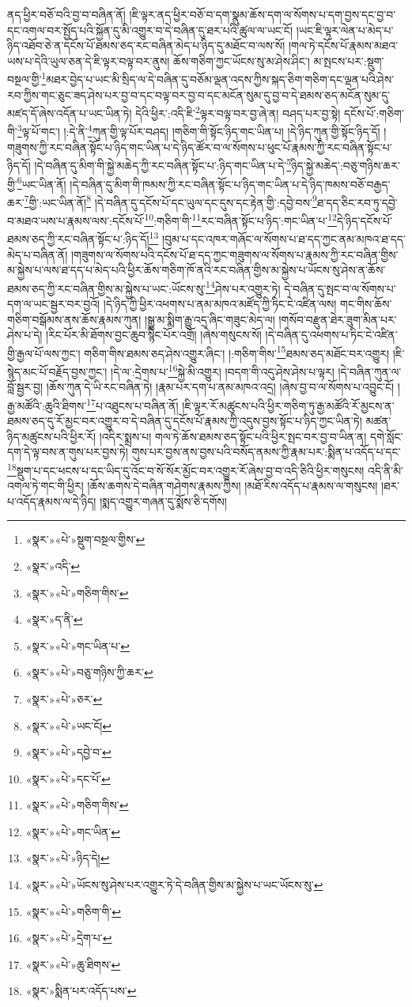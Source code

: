 ནད་ཕྱིར་བཅོ་བའི་བྱ་བ་བཞིན་ནོ། །ཇི་ལྟར་ནད་ཕྱིར་བཅོ་བ་དག་སྣུམ་ཆོས་དག་ལ་སོགས་པ་དག་བྱས་དང་བྱ་བ་དང་འགལ་བར་སྤྱོད་པའི་སྐྱོན་དུ་མི་འགྱུར་བ་དེ་བཞིན་དུ་ཐར་པའི་ཚུལ་ལ་ཡང་ངོ། །ཡང་ཇི་ལྟར་ལེན་པ་མེད་པ་ཉིད་འཐོབ་ཅེ་ན་དངོས་པོ་ཐམས་ཅད་རང་བཞིན་མེད་པ་ཉིད་དུ་མཐོང་བ་ལས་སོ། །གལ་ཏེ་དངོས་པོ་རྣམས་མཐའ་ཡས་པ་དེའི་ཡུལ་ཅན་དེ་ཇི་ལྟར་བལྟ་བར་ནུས། ཆོས་གཅིག་ཀྱང་ཡོངས་སུ་མ་ཤེས་ཤིང་། མ་སྤངས་པར་:སྡུག་བསྔལ་གྱི་\footnote{«སྣར་»«པེ་»སྡུག་བསྔལ་གྱིས་}མཐར་བྱེད་པ་ཡང་མི་སྲིད་ལ་དེ་བཞིན་དུ་བཅོམ་ལྡན་འདས་ཀྱིས་སྐད་ཅིག་གཅིག་དང་ལྡན་པའི་ཤེས་རབ་ཀྱིས་གང་ཅུང་ཟད་ཤེས་པར་བྱ་བ་དང་བལྟ་བར་བྱ་བ་དང་མངོན་སུམ་དུ་བྱ་བ་དེ་ཐམས་ཅད་མངོན་སུམ་དུ་མཛད་དོ་ཞེས་འདོན་པ་ཡང་ཡིན་ཏེ། དེའི་ཕྱིར་:འདི་ཇི་\footnote{«སྣར་»འདི་}ལྟར་བལྟ་བར་བྱ་ཞེ་ན། བཤད་པར་བྱ་སྟེ། དངོས་པོ་:གཅིག་གི་\footnote{«སྣར་»«པེ་»གཅིག་གིས་}ལྟ་པོ་གང་། །:དེ་ནི་\footnote{«སྣར་»ད་ནི་}ཀུན་གྱི་ལྟ་པོར་བཤད། །གཅིག་གི་སྟོང་ཉིད་གང་ཡིན་པ། །དེ་ཉིད་ཀུན་གྱི་སྟོང་ཉིད་དོ། །གཟུགས་ཀྱི་རང་བཞིན་སྟོང་པ་ཉིད་གང་ཡིན་པ་དེ་ཉིད་ཚོར་བ་ལ་སོགས་པ་ཕུང་པོ་རྣམས་ཀྱི་རང་བཞིན་སྟོང་པ་ཉིད་དོ། །དེ་བཞིན་དུ་མིག་གི་སྐྱེ་མཆེད་ཀྱི་རང་བཞིན་སྟོང་པ་:ཉིད་གང་ཡིན་པ་དེ་\footnote{«སྣར་»«པེ་»གང་ཡིན་པ་}ཉིད་སྐྱེ་མཆེད་:བཅུ་གཉིས་ཆར་གྱི་\footnote{«སྣར་»«པེ་»བཅུ་གཉིས་ཀྱི་ཆར་}ཡང་ཡིན་ནོ། །དེ་བཞིན་དུ་མིག་གི་ཁམས་ཀྱི་རང་བཞིན་སྟོང་པ་ཉིད་གང་ཡིན་པ་དེ་ཉིད་ཁམས་བཅོ་བརྒྱད་ཆར་\footnote{«སྣར་»«པེ་»ཅར་}གྱི་:ཡང་ཡིན་ནོ།\footnote{«སྣར་»«པེ་»ཡང་ངོ།} །དེ་བཞིན་དུ་དངོས་པོ་དང་ཡུལ་དང་དུས་དང་རྟེན་གྱི་:དབྱེ་བས་\footnote{«སྣར་»«པེ་»དབྱེ་བ་}ཐ་དད་ཅིང་རབ་ཏུ་དབྱེ་བ་མཐའ་ཡས་པ་རྣམས་ལས་:དངོས་པོ་\footnote{«སྣར་»«པེ་»དང་པོ་}:གཅིག་གི་\footnote{«སྣར་»«པེ་»གཅིག་གིས་}རང་བཞིན་སྟོང་པ་ཉིད་:གང་ཡིན་པ་\footnote{«སྣར་»«པེ་»གང་ཡིན་}དེ་ཉིད་དངོས་པོ་ཐམས་ཅད་ཀྱི་རང་བཞིན་སྟོང་པ་:ཉིད་དོ།\footnote{«སྣར་»«པེ་»ཉིད་དེ།} །བུམ་པ་དང་འཁར་གཞོང་ལ་སོགས་པ་ཐ་དད་ཀྱང་ནམ་མཁའ་ཐ་དད་མེད་པ་བཞིན་ནོ། །གཟུགས་ལ་སོགས་པའི་དངོས་པོ་ཐ་དད་ཀྱང་གཟུགས་ལ་སོགས་པ་རྣམས་ཀྱི་རང་བཞིན་གྱིས་མ་སྐྱེས་པ་ལས་ཐ་དད་པ་མེད་པའི་ཕྱིར་ཆོས་གཅིག་ཁོ་ནའི་རང་བཞིན་གྱིས་མ་སྐྱེས་པ་ཡོངས་སུ་ཤེས་ན་ཆོས་ཐམས་ཅད་ཀྱི་རང་བཞིན་གྱིས་མ་སྐྱེས་པ་ཡང་:ཡོངས་སུ་\footnote{«སྣར་»«པེ་»ཡོངས་སུ་ཤེས་པར་འགྱུར་ཏེ་དེ་བཞིན་གྱིས་མ་སྐྱེས་པ་ཡང་ཡོངས་སུ་}ཤེས་པར་འགྱུར་ཏེ། དེ་བཞིན་དུ་སྤང་བ་ལ་སོགས་པ་དག་ལ་ཡང་སྦྱར་བར་བྱའོ། །དེ་ཉིད་ཀྱི་ཕྱིར་འཕགས་པ་ནམ་མཁའ་མཛོད་ཀྱི་ཏིང་ངེ་འཛིན་ལས། གང་གིས་ཆོས་གཅིག་བསྒོམས་ནས་ཆོས་རྣམས་ཀུན། །སྒྱུ་མ་སྨིག་རྒྱུ་འདྲ་ཞིང་གཟུང་མེད་ལ། །གསོབ་བརྫུན་ཐེར་ཟུག་མིན་པར་ཤེས་པ་དེ། །རིང་པོར་མི་ཐོགས་བྱང་ཆུབ་སྙིང་པོར་འགྲོ། །ཞེས་གསུངས་སོ། །དེ་བཞིན་དུ་འཕགས་པ་ཏིང་ངེ་འཛིན་གྱི་རྒྱལ་པོ་ལས་ཀྱང་། གཅིག་གིས་ཐམས་ཅད་ཤེས་འགྱུར་ཞིང་། །:གཅིག་གིས་\footnote{«སྣར་»«པེ་»གཅིག་གི་}ཐམས་ཅད་མཐོང་བར་འགྱུར། །ཇི་སྙེད་མང་པོ་བརྗོད་བྱས་ཀྱང་། །དེ་ལ་:དྲེགས་པ་\footnote{«སྣར་»«པེ་»དྲེག་པ་}སྐྱེ་མི་འགྱུར། །བདག་གི་འདུ་ཤེས་ཤེས་པ་ལྟར། །དེ་བཞིན་ཀུན་ལ་བློ་སྦྱར་བྱ། །ཆོས་ཀུན་དེ་ཡི་རང་བཞིན་ཏེ། །རྣམ་པར་དག་པ་ནམ་མཁའ་འདྲ། །ཞེས་བྱ་བ་ལ་སོགས་པ་འབྱུང་ངོ། །རྒྱ་མཚོའི་:ཆུའི་ཐིགས་\footnote{«སྣར་»«པེ་»ཆུ་ཐིགས་}པ་འཐུངས་པ་བཞིན་ནོ། །ཇི་ལྟར་རོ་མཚུངས་པའི་ཕྱིར་གཅིག་ཏུ་རྒྱ་མཚོའི་རོ་མྱངས་ན་ཐམས་ཅད་དུ་རོ་མྱང་བར་འགྱུར་བ་དེ་བཞིན་དུ་དངོས་པོ་རྣམས་ཀྱི་འདུས་བྱས་སྟོང་པ་ཉིད་ཀྱང་ཡིན་ཏེ། མཚན་ཉིད་མཚུངས་པའི་ཕྱིར་རོ། །འདིར་སྨྲས་པ། གལ་ཏེ་ཆོས་ཐམས་ཅད་སྟོང་པའི་ཕྱིར་སྤང་བར་བྱ་བ་ཡིན་ན། དགེ་སློང་དག་དེ་ལྟ་བས་ན་གུས་པར་བྱས་ཏེ། གུས་པར་བྱས་ནས་བྱས་པའི་བསོད་ནམས་ཀྱི་རྣམ་པར་:སྨིན་པ་འདོད་པ་དང་\footnote{«སྣར་»སྨིན་པར་འདོད་པས་}སྡུག་པ་དང་ཕངས་པ་དང་ཡིད་དུ་འོང་བ་སོ་སོར་མྱོང་བར་འགྱུར་རོ་ཞེས་བྱ་བ་འདི་ཅིའི་ཕྱིར་གསུངས། འདི་ནི་མི་འགལ་ཏེ་གང་གི་ཕྱིར། །ཆོས་ཆགས་དེ་བཞིན་གཤེགས་རྣམས་ཀྱིས། །མཐོ་རིས་འདོད་པ་རྣམས་ལ་གསུངས། །ཐར་པ་འདོད་རྣམས་ལ་དེ་ཉིད། །སྨད་འགྱུར་གཞན་དུ་སྨོས་ཅི་དགོས། 